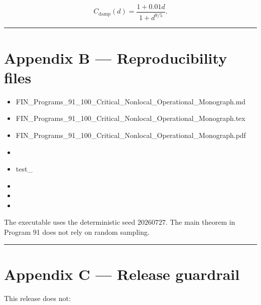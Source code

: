 \documentclass[11pt,a4paper,openany]{report}
\begin{document}
\[
C_{\mathrm{damp}}(d)
=
\frac{1+0.01d}{1+d^{9/5}}.
\]

\par\medskip\hrule\medskip

\chapter{Appendix B --- Reproducibility files}

\begin{itemize}
\item 
FIN\_Programs\_91\_100\_Critical\_Nonlocal\_Operational\_Monograph.md

\item 
FIN\_Programs\_91\_100\_Critical\_Nonlocal\_Operational\_Monograph.tex

\item 
FIN\_Programs\_91\_100\_Critical\_Nonlocal\_Operational\_Monograph.pdf

\item 
{}

\item 
test\_

\item 
{}

\item 
{}

\item 
{}

\end{itemize}

The executable uses the deterministic seed \(20260727\). The main theorem in Program 91 does not rely on random sampling.

\par\medskip\hrule\medskip

\chapter{Appendix C --- Release guardrail}

This release does not:
\end{document}
